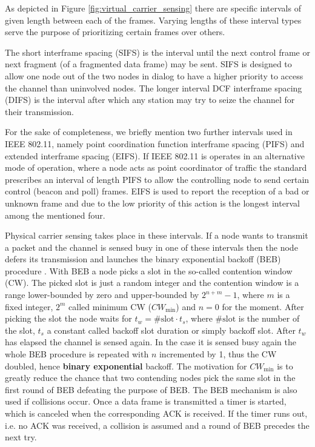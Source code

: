 As depicted in Figure \ref{fig:virtual_carrier_sensing} there are specific intervals of given length between each of the frames. Varying lengths of these interval types serve the purpose of prioritizing certain frames over others.

The short interframe spacing (SIFS) is the interval until the next control frame or next fragment (of a fragmented data frame) may be sent. SIFS is designed to allow one node out of the two nodes in dialog to have a higher priority to access the channel than uninvolved nodes. The longer interval DCF interframe spacing (DIFS) is the interval after which any station may try to seize the channel for their transmission.

For the sake of completeness, we briefly mention two further intervals used in IEEE 802.11, namely point coordination function interframe spacing (PIFS) and extended interframe spacing (EIFS). If IEEE 802.11 is operates in an alternative mode of operation, where a node acts as point coordinator of traffic the standard prescribes an interval of length PIFS to allow the controlling node to send certain control (beacon and poll) frames. EIFS is used to report the reception of a bad or unknown frame and due to the low priority of this action is the longest interval among the mentioned four. 

Physical carrier sensing takes place in these intervals. If a node wants to transmit a packet and the channel is sensed busy in one of these intervals then the node defers its transmission and launches the binary exponential backoff (BEB) procedure \cite{Gast05}. With BEB a node picks a slot in the so-called contention window (CW). The picked slot is just a random integer and the contention window is a range lower-bounded by zero and upper-bounded by $2^{n+m}-1$, where $m$ is a fixed integer, $2^m$ called minimum CW ($CW_\text{min}$) and $n=0$ for the moment. After picking the slot the node waits for $t_w = \text{\#slot} \cdot t_s$, where $\text{\#slot}$ is the number of the slot, $t_s$ a constant called backoff slot duration or simply backoff slot. After $t_w$ has elapsed the channel is sensed again. In the case it is sensed busy again the whole BEB procedure is repeated with $n$ incremented by 1, thus the CW doubled, hence \textbf{binary exponential} backoff.  The motivation for $CW_\text{min}$ is to greatly reduce the chance that two contending nodes pick the same slot in the first round of BEB defeating the purpose of BEB. The BEB mechanism is also used if collisions occur. Once a data frame is transmitted a timer is started, which is canceled when the corresponding ACK is received. If the timer runs out, i.e. no ACK was received, a collision is assumed and a round of BEB precedes the next try.    

